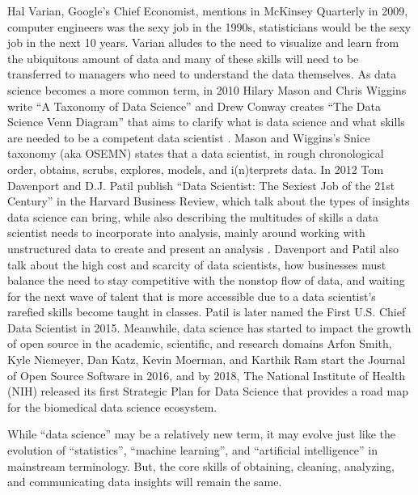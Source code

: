\documentclass[010-intro.tex]{subfiles}
\begin{document}
    Hal Varian, Google's Chief Economist, mentions in McKinsey Quarterly in 2009,
    computer engineers was the sexy job in the 1990s,
    statisticians would be the sexy job in the next 10 years.
    Varian alludes to
    the need to visualize and learn from the ubiquitous amount of data and
    many of these skills will need to be transferred to managers who need to understand the data themselves.
    As data science becomes a more common term,
    in 2010 Hilary Mason and Chris Wiggins write ``A Taxonomy of Data Science''
    \cite{masonTaxonomyDataScience2010}
    and
    Drew Conway creates ``The Data Science Venn Diagram''
    that aims to clarify what is data science and what skills are needed to be a competent data scientist
    \cite{conwayDataScienceVenn}.
    Mason and Wiggins's Snice taxonomy (aka OSEMN) states that a data scientist, %
    in rough chronological order,
    obtains, scrubs, explores, models, and i(n)terprets data.
    In 2012 Tom Davenport and D.J. Patil publish ``Data Scientist: The Sexiest Job of the 21st Century'' in the Harvard Business Review, which talk about the types of insights data science can bring,
    while also describing the multitudes of skills a data scientist needs to incorporate into analysis,
    mainly around working with unstructured data to create and present an analysis
    \cite{davenportDataScientistSexiest2012}.
    Davenport and Patil also talk about the high cost and scarcity of data scientists,
    how businesses must balance the need to stay competitive with the nonstop flow of data,
    and waiting for the next wave of talent that is more accessible
    due to a data scientist's rarefied skills become taught in classes.
    Patil is later named the First U.S. Chief Data Scientist in 2015.
    Meanwhile, data science has started to impact the growth of open source in the academic, scientific, and research domains %
    Arfon Smith, Kyle Niemeyer, Dan Katz, Kevin Moerman, and Karthik Ram start
    the Journal of Open Source Software in 2016, and by 2018,
    The National Institute of Health (NIH) released its first Strategic Plan for Data Science
    that provides a road map for the biomedical data science ecosystem.

    While ``data science'' may be a relatively new term,
    it may evolve just like the evolution of ``statistics'', ``machine learning'', and ``artificial intelligence''
    in mainstream terminology.
    But, the core skills of obtaining, cleaning, analyzing, and communicating data insights will remain the same.
\end{document}
